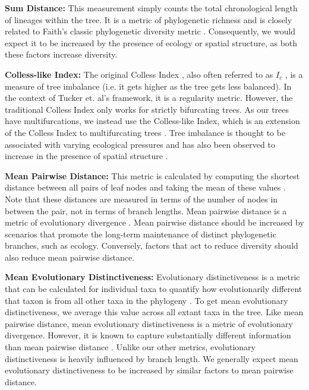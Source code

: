 \textbf{Sum Distance:} This measurement simply counts the total chronological length of lineages within the tree.
It is a metric of phylogenetic richness and is closely related to Faith's classic phylogenetic diversity metric \citep{faithConservationEvaluationPhylogenetic1992}.
Consequently, we would expect it to be increased by the presence of ecology or spatial structure, as both these factors increase diversity.

\textbf{Colless-like Index:}
The original Colless Index \citep{collessReviewPhylogeneticsTheory1982}, also often referred to as $I_c$ \citep{shaoTreeBalance1990}, is a measure of tree imbalance (i.e. it gets higher as the tree gets less balanced).
In the context of Tucker et.
al's framework, it is a regularity metric.
However, the traditional Colless Index only works for strictly bifurcating trees.
As our trees have multifurcations, we instead use the Colless-like Index, which is an extension of the Colless Index to multifurcating trees \citep{mirSoundCollesslikeBalance2018}.
Tree imbalance is thought to be associated with varying ecological pressures \citep{chamberlainPhylogeneticTreeShape2014, burressEcologicalOpportunityAlters} and has also been observed to increase in the presence of spatial structure \citep{scottInferringTumorProliferative2020}.

\textbf{Mean Pairwise Distance:}
This metric is calculated by computing the shortest distance between all pairs of leaf nodes and taking the mean of these values \citep{webbExploringPhylogeneticStructure2000}.
Note that these distances are measured in terms of the number of nodes in between the pair, not in terms of branch lengths.
Mean pairwise distance is a metric of evolutionary divergence \citep{tuckerGuidePhylogeneticMetrics2017}.
Mean pairwise distance should be increased by scenarios that promote the long-term maintenance of distinct phylogenetic branches, such as ecology.
Conversely, factors that act to reduce diversity should also reduce mean pairwise distance.

\textbf{Mean Evolutionary Distinctiveness:}
Evolutionary distinctiveness is a metric that can be calculated for individual taxa to quantify how evolutionarily different that taxon is from all other taxa in the phylogeny \citep{isaacMammalsEDGEConservation2007}.
To get mean evolutionary distinctiveness, we average this value across all extant taxa in the tree.
Like mean pairwise distance, mean evolutionary distinctiveness is a metric of evolutionary divergence.
However, it is known to capture substantially different information than mean pairwise distance \citep{tuckerGuidePhylogeneticMetrics2017}.
Unlike our other metrics, evolutionary distinctiveness is heavily influenced by branch length.
We generally expect mean evolutionary distinctiveness to be increased by similar factors to mean pairwise distance.


